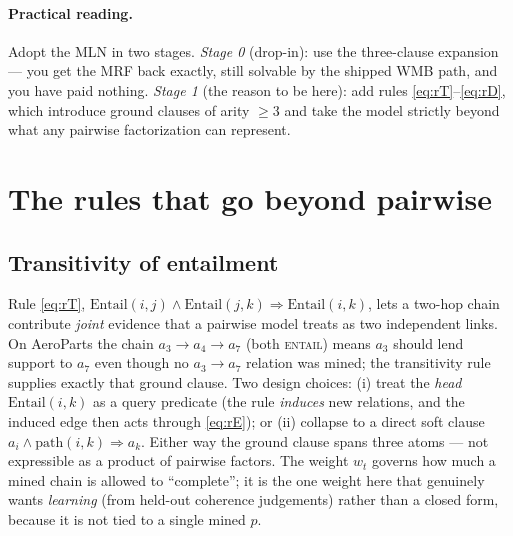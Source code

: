 \documentclass[11pt]{article}
\newcommand{\Ent}{\textsc{entail}}
\begin{document}
\paragraph{Practical reading.} Adopt the MLN in two stages. \emph{Stage 0} (drop-in): use the
three-clause expansion --- you get the MRF back exactly, still solvable by the shipped WMB
path, and you have paid nothing. \emph{Stage 1} (the reason to be here): add rules
\eqref{eq:rT}--\eqref{eq:rD}, which introduce ground clauses of arity $\ge 3$ and take the
model strictly beyond what any pairwise factorization can represent.

\section{The rules that go beyond pairwise}
\label{sec:beyond}

\subsection{Transitivity of entailment}
Rule \eqref{eq:rT}, $\mathrm{Entail}(i,j)\wedge\mathrm{Entail}(j,k)\Rightarrow\mathrm{Entail}(i,k)$,
lets a two-hop chain contribute \emph{joint} evidence that a pairwise model treats as two
independent links. On AeroParts the chain $a_3\!\to\!a_4\!\to\!a_7$ (both \Ent{}) means
$a_3$ should lend support to $a_7$ even though no $a_3\!\to\!a_7$ relation was mined; the
transitivity rule supplies exactly that ground clause. Two design choices: (i) treat the
\emph{head} $\mathrm{Entail}(i,k)$ as a query predicate (the rule \emph{induces} new
relations, and the induced edge then acts through \eqref{eq:rE}); or (ii) collapse to a
direct soft clause $a_i\wedge\mathrm{path}(i,k)\Rightarrow a_k$. Either way the ground clause
spans three atoms --- not expressible as a product of pairwise factors. The weight $w_t$
governs how much a mined chain is allowed to ``complete''; it is the one weight here that
genuinely wants \emph{learning} (from held-out coherence judgements) rather than a closed
form, because it is not tied to a single mined $p$.
\end{document}
